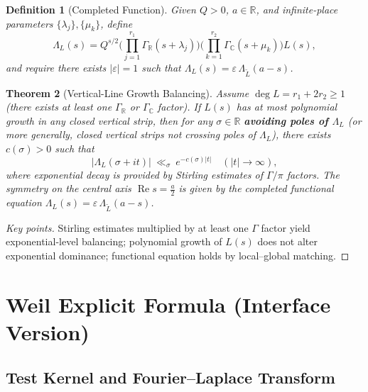 \documentclass[11pt,a4paper]{article}
\newtheorem{theorem}{Theorem}[section]
\newtheorem{definition}[theorem]{Definition}
\theoremstyle{remark}
\DeclareMathOperator{\Re}{Re}
\begin{document}
\begin{definition}[Completed Function]\label{def:completed}
Given $Q>0$, $a\in\mathbb{R}$, and infinite-place parameters $\{\lambda_j\},\{\mu_k\}$, define
\begin{equation}
\Lambda_{L}(s)=Q^{s/2}\Big(\prod_{j=1}^{r_1}\Gamma_{\mathbb{R}}(s+\lambda_j)\Big)
\Big(\prod_{k=1}^{r_2}\Gamma_{\mathbb{C}}(s+\mu_k)\Big)L(s),
\end{equation}
and require there exists $|\varepsilon|=1$ such that $\Lambda_{L}(s)=\varepsilon\,\Lambda_{\tilde{L}}(a-s)$.
\end{definition}

\begin{theorem}[Vertical-Line Growth Balancing]\label{thm:growth}
Assume $\deg L=r_1+2r_2\ge 1$ (there exists at least one $\Gamma_{\mathbb{R}}$ or $\Gamma_{\mathbb{C}}$ factor). If $L(s)$ has at most polynomial growth in any closed vertical strip, then for any $\sigma\in\mathbb{R}$ \textbf{avoiding poles of $\Lambda_{L}$} (or more generally, closed vertical strips not crossing poles of $\Lambda_{L}$), there exists $c(\sigma)>0$ such that
\begin{equation}
\big|\Lambda_{L}(\sigma+it)\big|\ \ll_{\sigma}\ e^{-c(\sigma)|t|}\quad(|t|\to\infty),
\end{equation}
where exponential decay is provided by Stirling estimates of $\Gamma/\pi$ factors. The symmetry on the central axis $\Re s=\frac{a}{2}$ is given by the completed functional equation $\Lambda_{L}(s)=\varepsilon\,\Lambda_{\tilde{L}}(a-s)$.
\end{theorem}

\begin{proof}[Key points]
Stirling estimates multiplied by at least one $\Gamma$ factor yield exponential-level balancing; polynomial growth of $L(s)$ does not alter exponential dominance; functional equation holds by local--global matching.
\end{proof}

\section{Weil Explicit Formula (Interface Version)}

\subsection{Test Kernel and Fourier--Laplace Transform}
\end{document}
